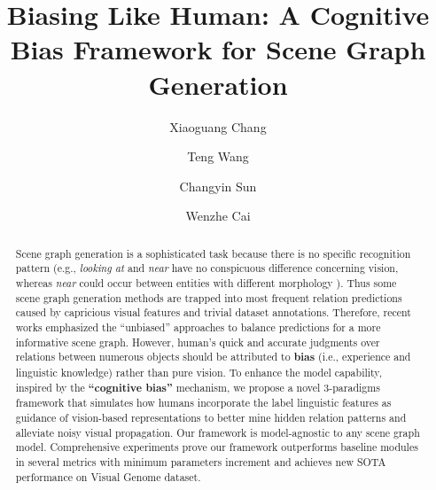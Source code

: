 \documentclass[runningheads]{llncs}
\begin{document}
\pagestyle{headings}
\mainmatter
\def\ECCVSubNumber{5935}  

\title{Biasing Like Human: A Cognitive Bias Framework for Scene Graph
  Generation} 

\begin{comment}
\titlerunning{ECCV-20 submission ID \ECCVSubNumber}
\authorrunning{ECCV-20 submission ID \ECCVSubNumber}
\author{Anonymous ECCV submission}
\institute{Paper ID \ECCVSubNumber}
\end{comment}

\author{Xiaoguang Chang \and
  Teng Wang \and
  Changyin Sun \and
  Wenzhe Cai}
\maketitle
\begin{abstract}
  Scene graph generation is a sophisticated task because there is no specific
  recognition pattern (e.g., \textit{looking at} and \textit{near} have no
  conspicuous difference concerning vision, whereas \textit{near} could occur
  between entities with different morphology ). Thus some scene graph generation
  methods are trapped into most frequent relation predictions caused
  by capricious visual features and trivial dataset annotations. Therefore,
  recent works emphasized the “unbiased” approaches to balance predictions for a
  more informative scene graph. However, human's quick and accurate judgments
  over relations between numerous objects should	be attributed to \textbf{bias}
  (i.e., experience and linguistic knowledge) rather than pure vision. To enhance
  the model capability, inspired by the \textbf{“cognitive bias”} mechanism,  we
  propose a novel 3-paradigms framework that simulates how humans incorporate the
  label linguistic features as guidance of vision-based representations to better
  mine hidden relation patterns and alleviate noisy visual propagation.  Our
  framework is model-agnostic to any scene graph model. Comprehensive experiments
  prove our framework outperforms baseline modules in several metrics with
  minimum parameters increment and achieves new SOTA performance on Visual Genome
  dataset.

\end{abstract}
\end{document}
